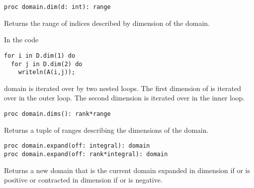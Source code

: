 \begin{protohead}
\begin{verbatim}
proc domain.dim(d: int): range
\end{verbatim}
\end{protohead}
\begin{protobody}
Returns the range of indices described by dimension  of the
domain.
\end{protobody}

\begin{example}
In the code
\begin{chapel}
\begin{verbatim}
for i in D.dim(1) do
  for j in D.dim(2) do
    writeln(A(i,j));
\end{verbatim}
\end{chapel}
domain  is iterated over by two nested loops.  The first
dimension of  is iterated over in the outer loop.  The second
dimension is iterated over in the inner loop.
\end{example}

\begin{protohead}
\begin{verbatim}
proc domain.dims(): rank*range
\end{verbatim}
\end{protohead}
\begin{protobody}
Returns a tuple of ranges describing the dimensions of the domain.
\end{protobody}


\begin{protohead}
\begin{verbatim}
proc domain.expand(off: integral): domain
proc domain.expand(off: rank*integral): domain
\end{verbatim}
\end{protohead}
\begin{protobody}
Returns a new domain that is the current domain expanded in
dimension  if  or  is positive or
contracted in dimension  if  or  is
negative.
\end{protobody}

